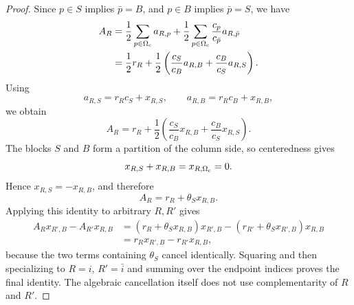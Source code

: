 \documentclass[11pt]{article}
\begin{document}
\begin{proof}
Since $p\in S$ implies $\bar p=B$, and $p\in B$ implies $\bar p=S$, we have
\begin{align*}
A_R
&=\frac12\sum_{p\in\Omega_{\rm c}}a_{R,p}
 +\frac12\sum_{p\in\Omega_{\rm c}}
 \frac{c_p}{c_{\bar p}}a_{R,\bar p}\\
&=\frac12r_R
 +\frac12\left(
 \frac{c_S}{c_B}a_{R,B}
 +\frac{c_B}{c_S}a_{R,S}
 \right).
\end{align*}
Using
\[
a_{R,S}=r_Rc_S+x_{R,S},
\qquad
a_{R,B}=r_Rc_B+x_{R,B},
\]
we obtain
\[
A_R
=r_R+\frac12\left(
\frac{c_S}{c_B}x_{R,B}
+
\frac{c_B}{c_S}x_{R,S}
\right).
\]
The blocks $S$ and $B$ form a partition of the column side, so centeredness
gives
\[
x_{R,S}+x_{R,B}=x_{R,\Omega_{\rm c}}=0.
\]
Hence $x_{R,S}=-x_{R,B}$, and therefore
\[
A_R=r_R+\theta_Sx_{R,B}.
\]
Applying this identity to arbitrary $R,R'$ gives
\begin{align*}
A_R x_{R',B}-A_{R'}x_{R,B}
&=(r_R+\theta_Sx_{R,B})x_{R',B}
 -(r_{R'}+\theta_Sx_{R',B})x_{R,B}\\
&=r_R x_{R',B}-r_{R'}x_{R,B},
\end{align*}
because the two terms containing $\theta_S$ cancel identically.  Squaring and
then specializing to $R=i$, $R'=\bar i$ and summing over the endpoint
indices proves the final identity.  The algebraic cancellation itself does
not use complementarity of $R$ and $R'$.
\end{proof}
\end{document}
